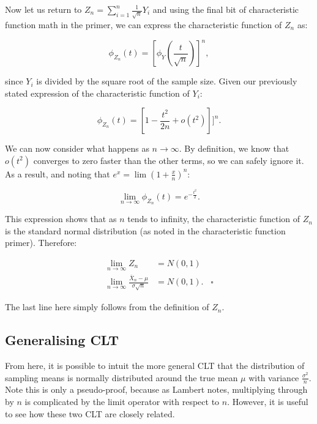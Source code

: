 \documentclass[
]{book}
\begin{document}
Now let us return to \(Z_n = \sum_{i=1}^{n}\frac{1}{\sqrt{n}}Y_i\) and using the final bit of characteristic function math in the primer, we can express the characteristic function of \(Z_n\) as:

\begin{equation}
\phi_{Z_n} (t) = [\phi_{Y} (\frac{t}{\sqrt{n}})]^n,
\end{equation}

since \(Y_i\) is divided by the square root of the sample size. Given our previously stated expression of the characteristic function of \(Y_i\):

\begin{equation}
\phi_{Z_n} (t) = [1 - \frac{t^2}{2n} + o(t^2)]]^n.
\end{equation}

We can now consider what happens as \(n \to \infty\). By definition, we know that \(o(t^2)\) converges to zero faster than the other terms, so we can safely ignore it. As a result, and noting that \(e^x = \lim(1+\frac{x}{n})^n\):

\begin{equation}
\lim_{n \to \infty}\phi_{Z_n} (t) = e^{-\frac{t^2}{2}}.
\end{equation}

This expression shows that as \(n\) tends to infinity, the characteristic function of \(Z_n\) is the standard normal distribution (as noted in the characteristic function primer). Therefore:

\begin{align}
\lim_{n \to \infty}Z_n &= N(0,1) \\
\lim_{n \to \infty}\frac{\bar{X}_n - \mu}{\sigma\sqrt{n}} &= N(0,1). \; \; \; \square
\end{align}

The last line here simply follows from the definition of \(Z_n\).

\hypertarget{generalising-clt}{%
\subsection{Generalising CLT}\label{generalising-clt}}

From here, it is possible to intuit the more general CLT that the distribution of sampling means is normally distributed around the true mean \(\mu\) with variance \(\frac{\sigma^2}{n}\). Note this is only a pseudo-proof, because as Lambert notes, multiplying through by \(n\) is complicated by the limit operator with respect to \(n\). However, it is useful to see how these two CLT are closely related.
\end{document}
